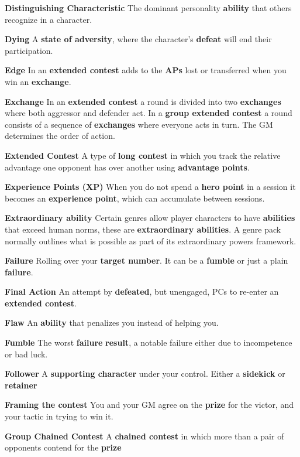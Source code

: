 \documentclass[
]{article}
\begin{document}
\textbf{Distinguishing Characteristic} The dominant personality
\textbf{ability} that others recognize in a character.

\textbf{Dying} A \textbf{state of adversity}, where the character's
\textbf{defeat} will end their participation.

\textbf{Edge} In an \textbf{extended contest} adds to the \textbf{APs}
lost or transferred when you win an \textbf{exchange}.

\textbf{Exchange} In an \textbf{extended contest} a round is divided
into two \textbf{exchanges} where both aggressor and defender act. In a
\textbf{group extended contest} a round consists of a sequence of
\textbf{exchanges} where everyone acts in turn. The GM determines the
order of action.

\textbf{Extended Contest} A type of \textbf{long contest} in which you
track the relative advantage one opponent has over another using
\textbf{advantage points}.

\textbf{Experience Points (XP)} When you do not spend a \textbf{hero
point} in a session it becomes an \textbf{experience point}, which can
accumulate between sessions.

\textbf{Extraordinary ability} Certain genres allow player characters to
have \textbf{abilities} that exceed human norms, these are
\textbf{extraordinary abilities}. A genre pack normally outlines what is
possible as part of its extraordinary powers framework.

\textbf{Failure} Rolling over your \textbf{target number}. It can be a
\textbf{fumble} or just a plain \textbf{failure}.

\textbf{Final Action} An attempt by \textbf{defeated}, but unengaged,
PCs to re-enter an \textbf{extended contest}.

\textbf{Flaw} An \textbf{ability} that penalizes you instead of helping
you.

\textbf{Fumble} The worst \textbf{failure} \textbf{result}, a notable
failure either due to incompetence or bad luck.

\textbf{Follower} A \textbf{supporting character} under your control.
Either a \textbf{sidekick} or \textbf{retainer}

\textbf{Framing the contest} You and your GM agree on the \textbf{prize}
for the victor, and your tactic in trying to win it.

\textbf{Group Chained Contest} A \textbf{chained contest} in which more
than a pair of opponents contend for the \textbf{prize}
\end{document}
